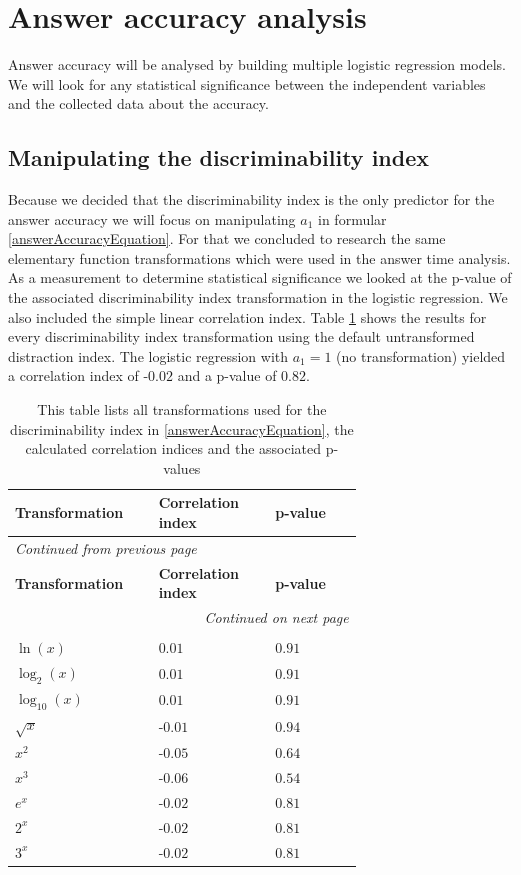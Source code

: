 \section{Answer accuracy analysis}
Answer accuracy will be analysed by building multiple logistic regression models. We will look for any statistical significance between the independent
variables and the collected data about the accuracy.

\subsection{Manipulating the discriminability index}
Because we decided that the discriminability index is the only predictor for the answer accuracy we will focus on manipulating $a_1$ in formular
\ref{answerAccuracyEquation}. For that we concluded to research the same elementary function transformations which were used in the answer time
analysis. As a measurement to determine statistical significance we looked at the p-value of the associated discriminability index transformation
in the logistic regression. We also included the simple linear correlation index. Table \ref{discriminabilityIndexTransformation} shows
the results for every discriminability index transformation using the default untransformed distraction index.
The logistic regression with $a_1 = 1$ (no transformation) yielded a correlation index of -$0.02$ and a p-value of $0.82$.
\begin{longtable}{| p{0.24\linewidth} | p{0.25\linewidth} | p{0.20\linewidth}|}
    \hline
    \textbf{Transformation} & \textbf{Correlation index} & \textbf{p-value} \\
    \hline
    \endfirsthead
    \multicolumn{3}{l}{{\textit{Continued from previous page}}} \\
    \hline
    \textbf{Transformation} & \textbf{Correlation index} & \textbf{p-value} \\
    \hline
    \endhead
    \hline \multicolumn{3}{r}{{\textit{Continued on next page}}} \\
    \endfoot
    \hline
    \caption{This table lists all transformations used for the discriminability index in \ref{answerAccuracyEquation}, the calculated correlation indices and the associated p-values \label{discriminabilityIndexTransformation}}\\
    \endlastfoot
    $ \ln(x) $ & $0.01$ & $0.91$ \\
    \hline
    $ \log_{2}(x) $ & $0.01$ & $0.91$ \\
    \hline
    $ \log_{10}(x) $ & $0.01$ & $0.91$ \\
    \hline
    $ \sqrt{x} $ & -$0.01$ & $0.94$ \\
    \hline
    $ x^2 $ & -$0.05$ & $0.64$ \\
    \hline
    $ x^3 $ & -$0.06$ & $0.54$ \\
    \hline
    $ e^x $ & -$0.02$ & $0.81$ \\
    \hline
    $ 2^x $ & -$0.02$ & $0.81$ \\
    \hline
    $ 3^x $ & -$0.02$ & $0.81$ \\
\end{longtable}

